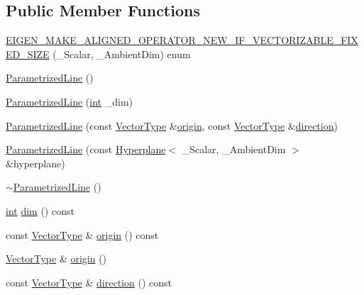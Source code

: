 \subsection*{Public Member Functions}
\begin{DoxyCompactItemize}
\item 
\hyperlink{class_parametrized_line_a02796f7a1aae57ac2c8cbb410004ec6a}{E\-I\-G\-E\-N\-\_\-\-M\-A\-K\-E\-\_\-\-A\-L\-I\-G\-N\-E\-D\-\_\-\-O\-P\-E\-R\-A\-T\-O\-R\-\_\-\-N\-E\-W\-\_\-\-I\-F\-\_\-\-V\-E\-C\-T\-O\-R\-I\-Z\-A\-B\-L\-E\-\_\-\-F\-I\-X\-E\-D\-\_\-\-S\-I\-Z\-E} (\-\_\-\-Scalar, \-\_\-\-Ambient\-Dim) enum
\item 
\hyperlink{class_parametrized_line_acb0ad9566c1a4ac57b2ac17125203984}{Parametrized\-Line} ()
\item 
\hyperlink{class_parametrized_line_a5d3921691d757ad8843d1c338cf27c87}{Parametrized\-Line} (\hyperlink{ioapi_8h_a787fa3cf048117ba7123753c1e74fcd6}{int} \-\_\-dim)
\item 
\hyperlink{class_parametrized_line_abc7eff4db1796ee48659a1448dcb8963}{Parametrized\-Line} (const \hyperlink{class_parametrized_line_a50da4abea0ab33894502d66459f261ba}{Vector\-Type} \&\hyperlink{ioapi_8h_a6ad5e17860121e666df109329b95c83e}{origin}, const \hyperlink{class_parametrized_line_a50da4abea0ab33894502d66459f261ba}{Vector\-Type} \&\hyperlink{class_parametrized_line_ac02a9d9489381e383d5f8e3ce43a639d}{direction})
\item 
\hyperlink{class_parametrized_line_ab71368e0269a63988f91929990c65f52}{Parametrized\-Line} (const \hyperlink{class_hyperplane}{Hyperplane}$<$ \-\_\-\-Scalar, \-\_\-\-Ambient\-Dim $>$ \&hyperplane)
\item 
\hyperlink{class_parametrized_line_a27d8f028f22b19f6051cb8dff2ac5b62}{$\sim$\-Parametrized\-Line} ()
\item 
\hyperlink{ioapi_8h_a787fa3cf048117ba7123753c1e74fcd6}{int} \hyperlink{class_parametrized_line_aee26dd595b1182d2c894537963093ed3}{dim} () const 
\item 
const \hyperlink{class_parametrized_line_a50da4abea0ab33894502d66459f261ba}{Vector\-Type} \& \hyperlink{class_parametrized_line_a51fe922fc27faa5a4d5079eac96e98e8}{origin} () const 
\item 
\hyperlink{class_parametrized_line_a50da4abea0ab33894502d66459f261ba}{Vector\-Type} \& \hyperlink{class_parametrized_line_af547b7cf08078e7a8e6b808b3f422c69}{origin} ()
\item 
const \hyperlink{class_parametrized_line_a50da4abea0ab33894502d66459f261ba}{Vector\-Type} \& \hyperlink{class_parametrized_line_ac02a9d9489381e383d5f8e3ce43a639d}{direction} () const 

\end{DoxyCompactItemize}
